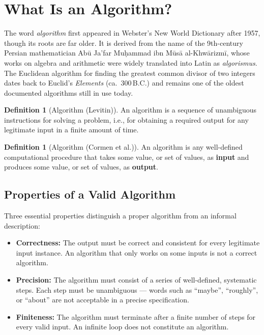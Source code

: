 \documentclass[11pt, a4paper, notitlepage]{report}
\theoremstyle{definition}
\newtheorem{definition}[theorem]{Definition}
\theoremstyle{remark}
\theoremstyle{definition}
\begin{document}
\section{What Is an Algorithm?}
\label{sec:what-is-algorithm}

The word \emph{algorithm} first appeared in Webster's New World Dictionary after 1957, though
its roots are far older. It is derived from the name of the 9th-century Persian mathematician
Abū Ja'far Muḥammad ibn Mūsā al-Khwārizmī, whose works on algebra and arithmetic were widely
translated into Latin as \emph{algorismus}. The Euclidean algorithm for finding the greatest
common divisor of two integers dates back to Euclid's \emph{Elements} (ca.\ 300\,B.C.) and
remains one of the oldest documented algorithms still in use today.

\begin{definition}[Algorithm (Levitin)]
\label{def:algorithm-levitin}
An algorithm is a sequence of unambiguous instructions for solving a problem, i.e., for
obtaining a required output for any legitimate input in a finite amount of time.
\end{definition}

\begin{definition}[Algorithm (Cormen et al.)]
\label{def:algorithm-cormen}
An algorithm is any well-defined computational procedure that takes some value, or set of
values, as \textbf{input} and produces some value, or set of values, as \textbf{output}.
\end{definition}

\subsection{Properties of a Valid Algorithm}
\label{subsec:algorithm-properties}

Three essential properties distinguish a proper algorithm from an informal description:

\begin{itemize}
  \item \textbf{Correctness:} The output must be correct and consistent for every legitimate
        input instance. An algorithm that only works on some inputs is not a correct algorithm.
  \item \textbf{Precision:} The algorithm must consist of a series of well-defined, systematic
        steps. Each step must be unambiguous --- words such as ``maybe'', ``roughly'', or
        ``about'' are not acceptable in a precise specification.
  \item \textbf{Finiteness:} The algorithm must terminate after a finite number of steps for
        every valid input. An infinite loop does not constitute an algorithm.
\end{itemize}
\end{document}
